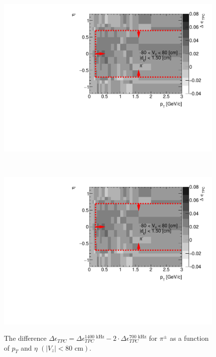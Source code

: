 \begin{figure}[H]
	\caption[The difference $\Delta\epsilon_{ TPC} =\Delta\epsilon_{ TPC}^{1400\text{ kHz}}-2\cdot\Delta\epsilon_{ TPC}^{700\text{ kHz}}$ for $\pi^\pm$ as a function of $p_T$ and $\eta$ $\left(|V_z|<80\text{ cm}\right)$]{The difference $\Delta\epsilon_{ TPC} =\Delta\epsilon_{ TPC}^{1400\text{ kHz}}-2\cdot\Delta\epsilon_{ TPC}^{700\text{ kHz}}$ for $\pi^\pm$ as a function of $p_T$ and $\eta$ $\left(|V_z|<80\text{ cm}\right)$. }
	\label{fig:systError2Dtpc}
	\centering
	\parbox{0.495\textwidth}{
		\centering
		\includegraphics[width=\linewidth,page=1]{graphics/systematicsEfficiency/bbc_and/tpcEffi_d0_1_5_etapt_12D.pdf}\\
	}~
	\parbox{0.495\textwidth}{
		\centering
		\includegraphics[width=\linewidth,page=2]{graphics/systematicsEfficiency/bbc_and/tpcEffi_d0_1_5_etapt_12D.pdf}\\
	}%
\end{figure}

